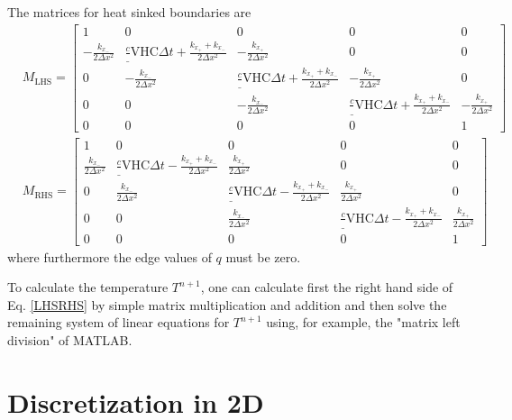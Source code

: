 \documentclass{scrartcl}
\newcommand{\VHC}{c_\mathrm{VHC}}
\begin{document}
The matrices for heat sinked boundaries are
\begin{align}
&M_\mathrm{LHS} = \begin{bmatrix}
1 & 0 & 0 & 0 & 0\\
- \frac{k_{x_-}}{2\Delta x^2} & \frac \VHC {\Delta t} + \frac{k_{x_+}+k_{x_-}}{2\Delta x^2} & - \frac{k_{x_+}}{2\Delta x^2} & 0 & 0\\
0 & - \frac{k_{x_-}}{2\Delta x^2} & \frac \VHC {\Delta t} + \frac{k_{x_+}+k_{x_-}}{2\Delta x^2} & - \frac{k_{x_+}}{2\Delta x^2} & 0\\
0 & 0 & - \frac{k_{x_-}}{2\Delta x^2} & \frac \VHC {\Delta t} + \frac{k_{x_+}+k_{x_-}}{2\Delta x^2} & - \frac{k_{x_+}}{2\Delta x^2}\\
0 & 0 & 0 & 0 & 1
\end{bmatrix}\\
&M_\mathrm{RHS} = \begin{bmatrix}
1 & 0 & 0 & 0 & 0\\
\frac{k_{x_-}}{2\Delta x^2} & \frac \VHC {\Delta t} - \frac{k_{x_+}+k_{x_-}}{2\Delta x^2} & \frac{k_{x_+}}{2\Delta x^2} & 0 & 0\\
0 & \frac{k_{x_-}}{2\Delta x^2} & \frac \VHC {\Delta t} - \frac{k_{x_+}+k_{x_-}}{2\Delta x^2} & \frac{k_{x_+}}{2\Delta x^2} & 0\\
0 & 0 & \frac{k_{x_-}}{2\Delta x^2} & \frac \VHC {\Delta t} - \frac{k_{x_+}+k_{x_-}}{2\Delta x^2} & \frac{k_{x_+}}{2\Delta x^2}\\
0 & 0 & 0 & 0 & 1
\end{bmatrix}
\end{align}
where furthermore the edge values of $q$ must be zero.

To calculate the temperature $T^{n+1}$, one can calculate first the right hand side of Eq. \ref{LHSRHS} by simple matrix multiplication and addition and then solve the remaining system of linear equations for $T^{n+1}$ using, for example, the "matrix left division" of MATLAB.

\section{Discretization in 2D}
\end{document}
